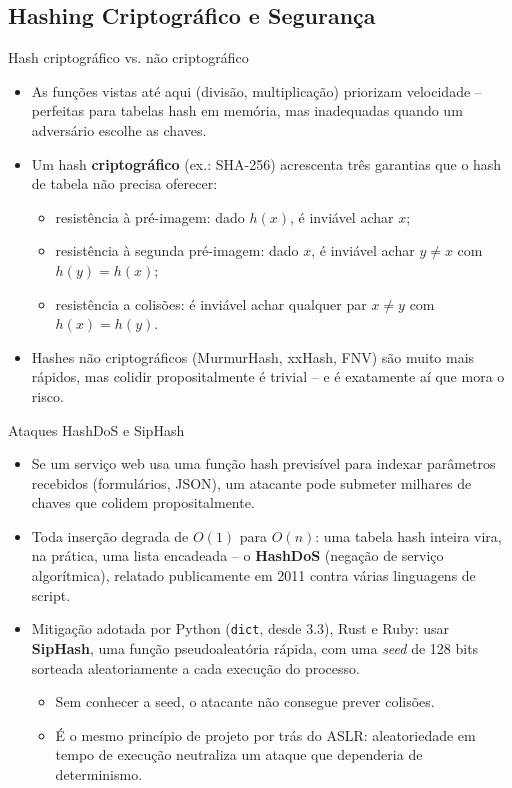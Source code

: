 \documentclass{beamer}
\begin{document}
\subsection{Hashing Criptográfico e Segurança}
\begin{frame}{Hash criptográfico vs. não criptográfico}
  \begin{itemize}
    \item As funções vistas até aqui (divisão, multiplicação) priorizam velocidade -- perfeitas para tabelas hash em memória, mas inadequadas quando um adversário escolhe as chaves.
    \item Um hash \textbf{criptográfico} (ex.: SHA-256) acrescenta três garantias que o hash de tabela não precisa oferecer:
    \begin{itemize}
      \item resistência à pré-imagem: dado $h(x)$, é inviável achar $x$;
      \item resistência à segunda pré-imagem: dado $x$, é inviável achar $y \ne x$ com $h(y)=h(x)$;
      \item resistência a colisões: é inviável achar qualquer par $x \ne y$ com $h(x)=h(y)$.
    \end{itemize}
    \item Hashes não criptográficos (MurmurHash, xxHash, FNV) são muito mais rápidos, mas colidir propositalmente é trivial -- e é exatamente aí que mora o risco.
  \end{itemize}
\end{frame}

\begin{frame}{Ataques HashDoS e SipHash}
  \begin{itemize}
    \item Se um serviço web usa uma função hash previsível para indexar parâmetros recebidos (formulários, JSON), um atacante pode submeter milhares de chaves que colidem propositalmente.
    \item Toda inserção degrada de $O(1)$ para $O(n)$: uma tabela hash inteira vira, na prática, uma lista encadeada -- o \textbf{HashDoS} (negação de serviço algorítmica), relatado publicamente em 2011 contra várias linguagens de script.
    \item Mitigação adotada por Python (\texttt{dict}, desde 3.3), Rust e Ruby: usar \textbf{SipHash}, uma função pseudoaleatória rápida, com uma \emph{seed} de 128 bits sorteada aleatoriamente a cada execução do processo.
    \begin{itemize}
      \item Sem conhecer a seed, o atacante não consegue prever colisões.
      \item É o mesmo princípio de projeto por trás do ASLR: aleatoriedade em tempo de execução neutraliza um ataque que dependeria de determinismo.
    \end{itemize}
  \end{itemize}
\end{frame}
\end{document}
